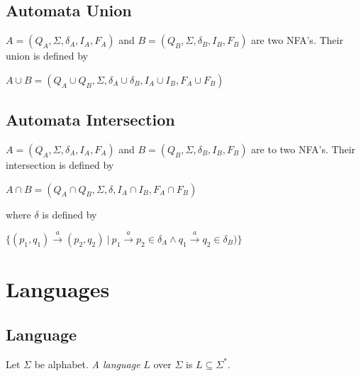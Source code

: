 	\subsection{Automata Union}
	\label{defAUnion}
	\begin{definition}
		$A=(Q_A,\Sigma,\delta_A,I_A,F_A)$ and $B=(Q_B,\Sigma,\delta_B,I_B,F_B)$ are two NFA's. Their union is defined by
		\begin{description}
			\item $A \cup B=(Q_A\cup Q_B,\Sigma,\delta_A\cup\delta_B,I_A\cup I_B,F_A\cup F_B)$
		\end{description}
	\end{definition}
	
	\subsection{Automata Intersection}
	\label{defAInter}
	\begin{definition}
		$A=(Q_A,\Sigma,\delta_A,I_A,F_A)$ and $B=(Q_B,\Sigma,\delta_B,I_B,F_B)$ are to two NFA's. Their intersection is defined by
		\begin{description}
			\item $A \cap B=(Q_A\cap Q_B,\Sigma,\delta,I_A\cap I_B,F_A\cap F_B)$\
		\end{description}
		where $\delta$ is defined by
		\begin{description}
			\item $\{(p_1,q_1) \xrightarrow{a} (p_2,q_2)\ |\ p_1 \xrightarrow{a} p_2 \in \delta_A \wedge q_1 \xrightarrow{a} q_2 \in \delta_B)\}$\
		\end{description}
	\end{definition}

\section{Languages}
		\subsection{Language}
		\label{defLang}
		\begin{definition}
			Let $\Sigma$ be alphabet. \emph{A language }$L$ over $\Sigma$ is $L\subseteq\Sigma^{*}$.
		\end{definition}
